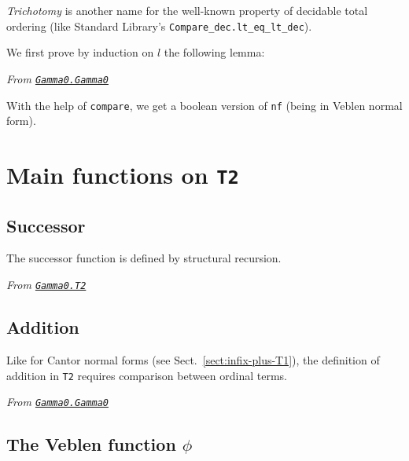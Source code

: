 {\emph{Trichotomy} is another name for the well-known property of decidable total ordering (like Standard Library's \texttt{Compare\_dec.lt\_eq\_lt\_dec}).

We first prove by induction on $l$ the following lemma:

\vspace{4pt}

\noindent\emph{From \href{../theories/html/hydras.Gamma0.Gamma0\#tricho_aux}%
{\texttt{Gamma0.Gamma0}}}






With the help of \texttt{compare}, we get a boolean version of \texttt{nf}
(being in Veblen normal form).







\section{Main functions on \texttt{T2}}

\subsection{Successor}
The successor function is defined by structural recursion.

\noindent\emph{From \href{../theories/html/hydras.Gamma0.T2.html\#succ}%
{\texttt{Gamma0.T2}}}




\subsection{Addition}

Like for Cantor normal forms (see Sect.~\ref{sect:infix-plus-T1}),  the definition of addition in \texttt{T2}  requires comparison between ordinal terms.

\noindent\emph{From \href{../theories/html/hydras.Gamma0.Gamma0T2.html\#succ}%
  {\texttt{Gamma0.Gamma0}}}





\subsection{The Veblen function \texorpdfstring{$\phi$}{\texttt{phi}}}

}
